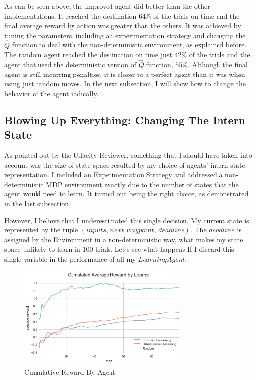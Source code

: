 \documentclass[a4paper]{article}
\begin{document}
As can be seen above, the improved agent did better than the other implementations. It reached the destination $64\%$ of the trials on time and the final average reward by action was greater than the others. It was achieved by tuning the parameters, including an experimentation strategy and changing the $\hat{Q}$ function to deal with the non-deterministic environment, as explained before. The random agent reached the destination on time just $42\%$ of the trials and the agent that used the deterministic version of $\hat{Q}$ function, $55\%$. Although the final agent is still incurring penalties, it is closer to a perfect agent than it was when using just random moves. In the next subsection, I will show how to change the behavior of the agent radically.

\subsection{Blowing Up Everything: Changing The Intern State}
As pointed out by the Udacity Reviewer, something that I should have taken into account was the size of state space resulted by my choice of agents' intern state representation. I included an Experimentation Strategy and addressed a non-deterministic MDP environment exactly due to the number of states that the agent would need to learn. It turned out being the right choice, as demonstrated in the last subsection.

However, I believe that I underestimated this single decision. My current state is represented by the tuple $(inputs,\, next\_waypoint,\, deadline)$. The $deadline$ is assigned by the Environment in a non-deterministic way, what makes my state space unlikely to learn in $100$ trials. Let's see what happens If I discard this single variable in the performance of all my $LearningAgent$:

\begin{figure}[ht!]
\centering
\includegraphics[width=0.75\textwidth]{images/performance_comparition_2.png}
\caption{\label{fig:perf_compr_2}Cumulative Reward By Agent}
\end{figure}
\end{document}
